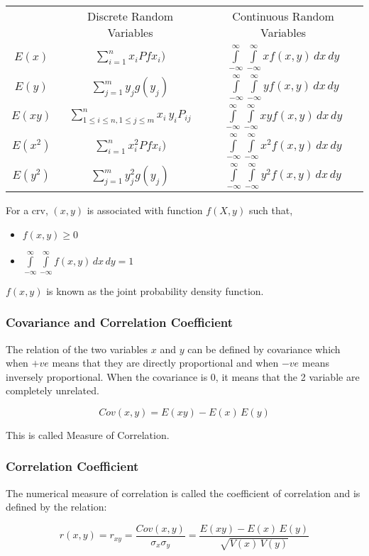 \documentclass[./EngineeringMaths.tex]{subfiles}
\begin{document}
\begin{center}
{\renewcommand{\arraystretch}{2}
\begin{tabular}{c|c|c|}
\cline{2-3}
& Discrete Random Variables & Continuous Random Variables \\
\cline{2-3}
\multicolumn{1}{c|}{$E(x)$} & $\sum\limits_{i=1}^n x_i Pfx_i)$ &  $\int\limits_{-\infty}^\infty\int\limits_{-\infty}^\infty x f(x,y) \, dx\,dy $ \\
\cline{2-3}
\multicolumn{1}{c|}{$E(y)$} & $\sum\limits_{j=1}^m y_j g(y_j)$ &  $\int\limits_{-\infty}^\infty\int\limits_{-\infty}^\infty y f(x,y) \, dx\,dy $ \\
\cline{2-3}
\multicolumn{1}{c|}{$E(xy)$} & $\sum\limits_{1\leq i\leq n,1\leq j\leq m}^n x_i\,y_i P_{ij}$ &  $\int\limits_{-\infty}^\infty\int\limits_{-\infty}^\infty xy f(x,y) \, dx\,dy $ \\
\cline{2-3}
\multicolumn{1}{c|}{$E(x^2)$} & $\sum\limits_{i=1}^n x_i^2 Pfx_i)$ &  $\int\limits_{-\infty}^\infty\int\limits_{-\infty}^\infty x^2 f(x,y) \, dx\,dy $ \\
\cline{2-3}
\multicolumn{1}{c|}{$E(y^2)$} & $\sum\limits_{j=1}^m y_j^2 g(y_j)$ &  $\int\limits_{-\infty}^\infty\int\limits_{-\infty}^\infty y^2 f(x,y) \, dx\,dy $ \\
\cline{2-3}
\end{tabular}}
\end{center}

For a crv, $(x,y)$ is associated with function $f(X,y)$ such that,
\begin{itemize}
\item $f(x,y) \geq 0$
\item $\int\limits_{-\infty}^\infty\int\limits_{-\infty}^\infty f(x,y) \,dx\,dy = 1$
\end{itemize}
$f(x,y)$ is known as the joint probability density function.

\subsubsection{Covariance and Correlation Coefficient}
The relation of the two variables $x$ and $y$ can be defined by covariance which when $+ve$ means that they are directly proportional and when $-ve$ means inversely proportional. When the covariance is 0, it means that the 2 variable are completely unrelated.

$$Cov(x,y) = E(xy) - E(x)\,E(y)$$

This is called Measure of Correlation.

\subsubsection*{Correlation Coefficient}
The numerical measure of correlation is called the coefficient of correlation and is defined by the relation: 

$$ r(x,y) = r_{xy} = \frac{Cov(x,y)}{\sigma_x\sigma_y} = \frac{E(xy) - E(x)\,E(y)}{\sqrt{V(x)\,V(y)}} $$
\end{document}

